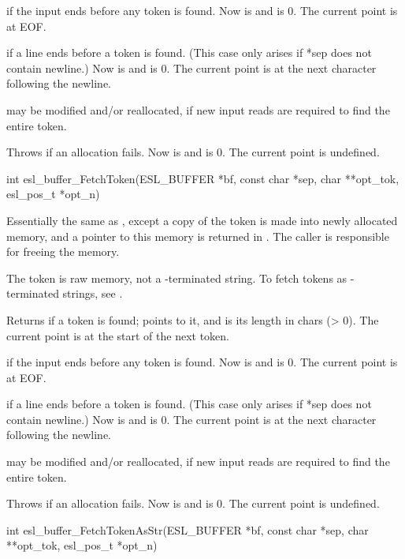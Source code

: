 \begin{sreapi}
 if the input ends before any token is found.
Now  is  and  is 0. The current
point is at EOF.

 if a line ends before a token is found.  (This
case only arises if *sep does not contain newline.)
Now  is  and  is 0. The current
point is at the next character following the newline.

 may be modified and/or reallocated, if new
input reads are required to find the entire token.

Throws  if an allocation fails.
Now  is  and  is 0. The
current point is undefined.


\hypertarget{func:esl_buffer_FetchToken()}
{\item[int esl\_buffer\_FetchToken(ESL\_BUFFER *bf, const char *sep, char **opt\_tok, esl\_pos\_t *opt\_n)]}

Essentially the same as , except a
copy of the token is made into newly allocated memory,
and a pointer to this memory is returned in .
The caller is responsible for freeing the memory. 

The token is raw memory, not a -terminated string. 
To fetch tokens as -terminated strings, see 
.

Returns  if a token is found;  points to it,
and  is its length in chars (> 0). The current
point is at the start of the next token.

 if the input ends before any token is found.
Now  is  and  is 0. The current
point is at EOF.

 if a line ends before a token is found.  (This
case only arises if *sep does not contain newline.)
Now  is  and  is 0. The current
point is at the next character following the newline.

 may be modified and/or reallocated, if new
input reads are required to find the entire token.

Throws  if an allocation fails.
Now  is  and  is 0. The
current point is undefined.


\hypertarget{func:esl_buffer_FetchTokenAsStr()}
{\item[int esl\_buffer\_FetchTokenAsStr(ESL\_BUFFER *bf, const char *sep, char **opt\_tok, esl\_pos\_t *opt\_n)]}


\end{sreapi}
